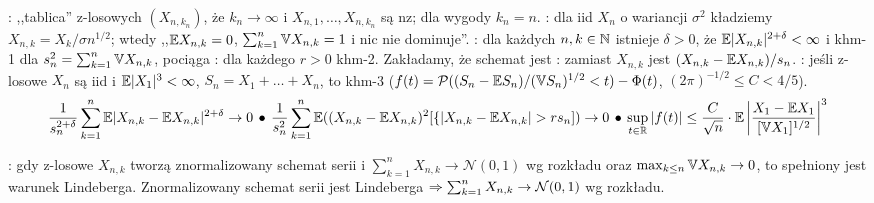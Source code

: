 :  ,,tablica'' z-losowych $(X_{n, k_n})$, że $k_n \to \infty$ i $X_{n, 1}, \dots, X_{n, k_n}$ są nz; dla wygody $k_n = n$.
: dla iid $X_n$ o wariancji $\sigma^2$ kładziemy $X_{n, k} = X_k / \sigma n^{1/2}$; wtedy ,,$\mathbb{E} X_{n, k} = 0$, $\sum_{k=1}^n \mathbb{V} X_{n, k} = 1$ i nic nie dominuje''. 
: dla każdych $n, k \in \mathbb N$ istnieje $\delta > 0$, że $\mathbb{E} |X_{n, k}|^{2+\delta} < \infty$ i khm-1 dla $s_n^2 = \sum_{k=1}^n \mathbb{V} X_{n, k}$, pociąga : dla każdego $r > 0$ khm-2.
Zakładamy, że schemat jest : zamiast $X_{n, k}$ jest $(X_{n, k} - \mathbb{E} X_{n, k}) / s_n$.
: jeśli z-losowe $X_n$ są iid i $\mathbb{E} |X_1|^3 < \infty$, $S_n = X_1 + \ldots + X_n$, to khm-3 ($f(t) = \operatorname{\mathcal{P}} ((S_n - \mathbb{E} S_n) / (\mathbb{V} S_n)^{1/2} < t) - \Phi(t)$, $(2\pi)^{-1/2} \le C < 4/5$).
\[
	\frac{1}{s_n^{2+\delta}} \sum_{k=1}^n \mathbb{E} |X_{n, k} - \mathbb{E} X_{n, k}|^{2+\delta} \to 0 \, \bullet \,
	\frac{1}{s_n^2} \sum_{k=1}^n \mathbb{E} ((X_{n, k} - \mathbb{E} X_{n, k})^2 [\{|X_{n,k} - \mathbb{E} X_{n,k}| > r s_n]) \to 0 \, \bullet \,
	\sup_{t \in \mathbb{R}} \left| f(t) \right| \le \frac{C}{\sqrt{n}} \cdot \mathbb{E} \left|\frac{X_1 - \mathbb{E} X_1}{[\mathbb{V} X_1]^{1/2}}\right|^3
\]

:  gdy z-losowe $X_{n, k}$ tworzą znormalizowany schemat serii i $\sum_{k=1}^n X_{n, k} \to \mathcal N(0, 1)$ wg rozkładu oraz $\max_{k \le n} \mathbb{V} X_{n, k} \to 0$, to spełniony jest warunek Lindeberga.
Znormalizowany schemat serii jest Lindeberga $\Rightarrow \sum_{k=1}^n X_{n, k} \to \mathcal N(0, 1)$ wg rozkładu.
